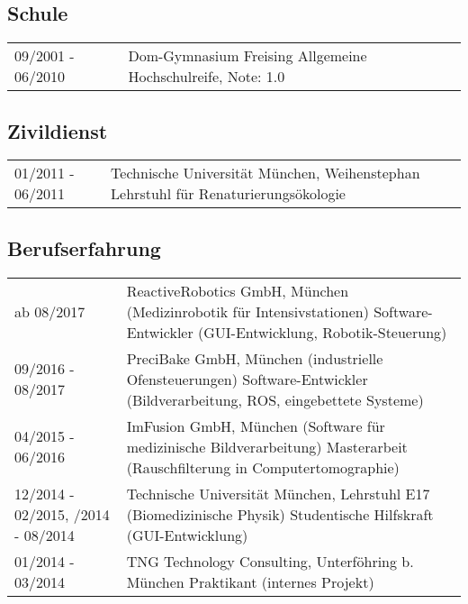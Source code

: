 \documentclass[a4paper,10pt]{memoir}
\begin{document}
\subsection*{Schule}
\vspace*{-\baselineskip}
\begin{longtable}{@{}p{} p{}}
  09/2001 - 06/2010 &
  Dom-Gymnasium Freising  \newline 
  Allgemeine Hochschulreife, Note: 1.0
\end{longtable}

\subsection*{Zivildienst}
\vspace*{-\baselineskip}
\begin{longtable}{@{}p{} p{}}
  01/2011 - 06/2011 &
  Technische Universität München, Weihenstephan \newline 
  Lehrstuhl für Renaturierungsökologie
\end{longtable}

\subsection*{Berufserfahrung}
\vspace*{-\baselineskip}
\begin{longtable}{@{}p{} p{}}
  ab 08/2017 &
  ReactiveRobotics GmbH, München (Medizinrobotik für Intensivstationen) \newline
  Software-Entwickler (GUI-Entwicklung, Robotik-Steuerung)
  \\
  09/2016 - 08/2017 &
  PreciBake GmbH, München (industrielle Ofensteuerungen) \newline 
  Software-Entwickler (Bildverarbeitung, ROS, eingebettete Systeme)
  \\
  04/2015 - 06/2016 &
  ImFusion GmbH, München (Software für medizinische Bildverarbeitung) \newline 
  Masterarbeit (Rauschfilterung in Computertomographie)
  \\
  12/2014 - 02/2015, \newline
  06/2014 - 08/2014 &
  Technische Universität München, Lehrstuhl E17 (Biomedizinische Physik) \newline 
  Studentische Hilfskraft (GUI-Entwicklung)
  \\
  01/2014 - 03/2014 &
  TNG Technology Consulting, Unterföhring b. München \newline 
  Praktikant (internes Projekt)
\end{longtable}
\end{document}
